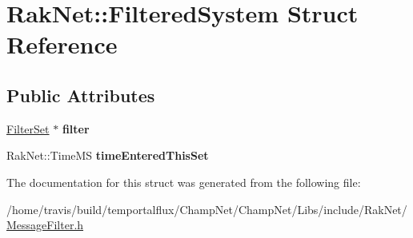 \hypertarget{struct_rak_net_1_1_filtered_system}{\section{Rak\-Net\-:\-:Filtered\-System Struct Reference}
\label{struct_rak_net_1_1_filtered_system}
}
\subsection*{Public Attributes}
\begin{DoxyCompactItemize}
\item 
\hypertarget{struct_rak_net_1_1_filtered_system_a33189ce3b81cb63b2246b9063d6313ef}{\hyperlink{struct_rak_net_1_1_filter_set}{Filter\-Set} $\ast$ {\bfseries filter}}\label{struct_rak_net_1_1_filtered_system_a33189ce3b81cb63b2246b9063d6313ef}

\item 
\hypertarget{struct_rak_net_1_1_filtered_system_a0bf5ea35257ab94f993c5e5d456e4c34}{Rak\-Net\-::\-Time\-M\-S {\bfseries time\-Entered\-This\-Set}}\label{struct_rak_net_1_1_filtered_system_a0bf5ea35257ab94f993c5e5d456e4c34}

\end{DoxyCompactItemize}


The documentation for this struct was generated from the following file\-:\begin{DoxyCompactItemize}
\item 
/home/travis/build/temportalflux/\-Champ\-Net/\-Champ\-Net/\-Libs/include/\-Rak\-Net/\hyperlink{_message_filter_8h}{Message\-Filter.\-h}\end{DoxyCompactItemize}
